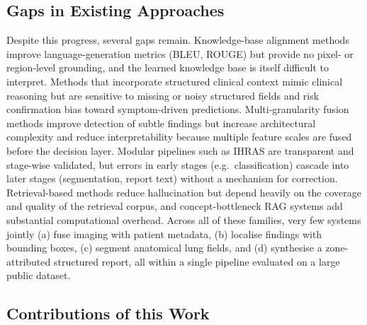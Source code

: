 \documentclass[preprint,12pt,authoryear]{elsarticle}
\begin{document}
\subsection{Gaps in Existing Approaches}
\label{sec:gaps}

Despite this progress, several gaps remain. Knowledge-base alignment methods \citep{yang_knowledge} improve language-generation metrics (BLEU, ROUGE) but provide no pixel- or region-level grounding, and the learned knowledge base is itself difficult to interpret. Methods that incorporate structured clinical context \citep{integrative_multimodal} mimic clinical reasoning but are sensitive to missing or noisy structured fields and risk confirmation bias toward symptom-driven predictions. Multi-granularity fusion methods \citep{mmg_fusion} improve detection of subtle findings but increase architectural complexity and reduce interpretability because multiple feature scales are fused before the decision layer. Modular pipelines such as IHRAS \citep{ihras} are transparent and stage-wise validated, but errors in early stages (e.g.\ classification) cascade into later stages (segmentation, report text) without a mechanism for correction. Retrieval-based methods \citep{xrem} reduce hallucination but depend heavily on the coverage and quality of the retrieval corpus, and concept-bottleneck RAG systems \citep{concept_rag} add substantial computational overhead. Across all of these families, very few systems jointly (a) fuse imaging with patient metadata, (b) localise findings with bounding boxes, (c) segment anatomical lung fields, and (d) synthesise a zone-attributed structured report, all within a single pipeline evaluated on a large public dataset.

\subsection{Contributions of this Work}
\label{sec:contributions}
\end{document}
